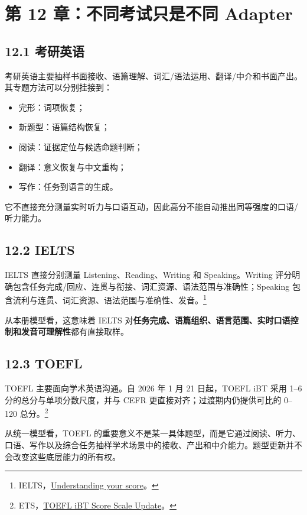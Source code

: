 \documentclass[11pt,a4paper]{ctexart}
\newcommand{\kw}[1]{\textbf{#1}}
\begin{document}
\section{第 12 章：不同考试只是不同 Adapter}

\subsection{12.1 考研英语}
考研英语主要抽样书面接收、语篇理解、词汇/语法运用、翻译/中介和书面产出。其专题方法可以分别挂接到：
\begin{itemize}
  \item 完形：词项恢复；
  \item 新题型：语篇结构恢复；
  \item 阅读：证据定位与候选命题判断；
  \item 翻译：意义恢复与中文重构；
  \item 写作：任务到语言的生成。
\end{itemize}
它不直接充分测量实时听力与口语互动，因此高分不能自动推出同等强度的口语/听力能力。

\subsection{12.2 IELTS}
IELTS 直接分别测量 Listening、Reading、Writing 和 Speaking。Writing 评分明确包含任务完成/回应、连贯与衔接、词汇资源、语法范围与准确性；Speaking 包含流利与连贯、词汇资源、语法范围与准确性、发音。\footnote{IELTS，\href{https://ielts.org/take-a-test/your-results/ielts-scoring-in-detail}{Understanding your score}。}

从本册模型看，这意味着 IELTS 对\kw{任务完成、语篇组织、语言范围、实时口语控制和发音可理解性}都有直接取样。

\subsection{12.3 TOEFL}
TOEFL 主要面向学术英语沟通。自 2026 年 1 月 21 日起，TOEFL iBT 采用 1--6 分的总分与单项分数尺度，并与 CEFR 更直接对齐；过渡期内仍提供可比的 0--120 总分。\footnote{ETS，\href{https://www.ets.org/toefl/institutions/ibt/score-scale-update.html}{TOEFL iBT Score Scale Update}。}

从统一模型看，TOEFL 的重要意义不是某一具体题型，而是它通过阅读、听力、口语、写作以及综合任务抽样学术场景中的接收、产出和中介能力。题型更新并不会改变这些底层能力的所有权。
\end{document}
